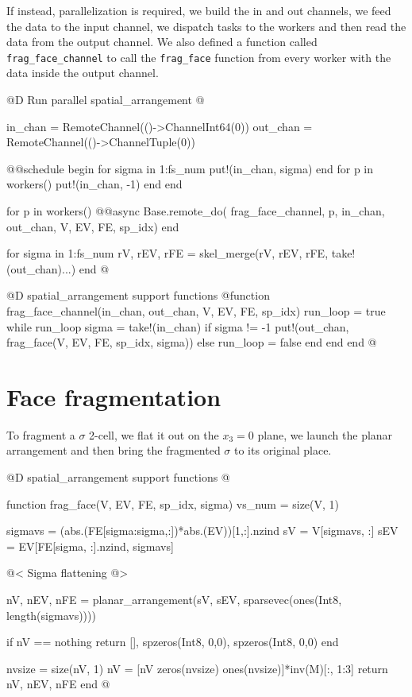 If instead, parallelization is required, we build the in and out channels,
we feed the data to the input channel, we dispatch tasks to the workers and then
read the data from the output channel. We also defined a function
called \texttt{frag\_face\_channel} to call the \texttt{frag\_face} function
from every worker with the data inside the output channel.

@D Run parallel spatial\_arrangement
@{in_chan = RemoteChannel(()->Channel{Int64}(0))
out_chan = RemoteChannel(()->Channel{Tuple}(0))

@@schedule begin
    for sigma in 1:fs_num
        put!(in_chan, sigma)
    end
    for p in workers()
        put!(in_chan, -1)
    end
end

for p in workers()
    @@async Base.remote_do(
        frag_face_channel, p, in_chan, out_chan, V, EV, FE, sp_idx)
end

for sigma in 1:fs_num
    rV, rEV, rFE = skel_merge(rV, rEV, rFE, take!(out_chan)...)
end
@}

@D spatial\_arrangement support functions
@{function frag_face_channel(in_chan, out_chan, V, EV, FE, sp_idx)
    run_loop = true
    while run_loop
        sigma = take!(in_chan)
        if sigma != -1
            put!(out_chan, frag_face(V, EV, FE, sp_idx, sigma))
        else
            run_loop = false
        end
    end
end
@}




\section{Face fragmentation}

To fragment a $\sigma$ 2-cell, we flat it out on the $x_3=0$ plane,
we launch the planar arrangement and then bring the fragmented $\sigma$
to its original place.

@D spatial\_arrangement support functions
@{function frag_face(V, EV, FE, sp_idx, sigma)
    vs_num = size(V, 1)

    sigmavs = (abs.(FE[sigma:sigma,:])*abs.(EV))[1,:].nzind 
    sV = V[sigmavs, :]
    sEV = EV[FE[sigma, :].nzind, sigmavs]

    @< Sigma flattening @>

    nV, nEV, nFE = planar_arrangement(sV, sEV, sparsevec(ones(Int8, length(sigmavs))))

    if nV == nothing
        return [], spzeros(Int8, 0,0), spzeros(Int8, 0,0)
    end

    nvsize = size(nV, 1)
    nV = [nV zeros(nvsize) ones(nvsize)]*inv(M)[:, 1:3]
    return nV, nEV, nFE
end
@}

